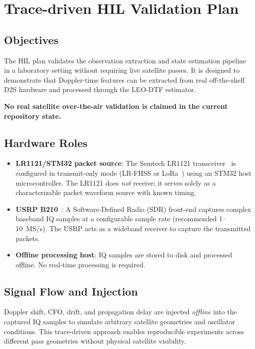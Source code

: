 \section{Trace-driven HIL Validation Plan}\label{sec:hil}

\subsection{Objectives}
The HIL plan validates the observation extraction and state estimation pipeline
in a laboratory setting without requiring live satellite passes.  It is designed
to demonstrate that Doppler-time features can be extracted from real
off-the-shelf D2S hardware and processed through the LEO-DTF estimator.

\textbf{No real satellite over-the-air validation is claimed in the current
repository state.}

\subsection{Hardware Roles}

\begin{itemize}
\item \textbf{LR1121/STM32 packet source}: The Semtech LR1121 transceiver~\cite{semtech_lr1121_datasheet}
        is configured in transmit-only mode (LR-FHSS or LoRa~\cite{semtech_lr_fhss_phy})
        using an STM32 host microcontroller.  The LR1121 does \emph{not} receive; it serves
        solely as a characterizable packet waveform source with known timing.
  \item \textbf{USRP B210}~\cite{ettus_usrp_b210}: A Software-Defined Radio (SDR) front-end captures
        complex baseband IQ samples at a configurable sample rate
        (recommended 1--10~MS/s).  The USRP acts as a wideband receiver to
        capture the transmitted packets.
  \item \textbf{Offline processing host}: IQ samples are stored to disk and
        processed offline.  No real-time processing is required.
\end{itemize}

\subsection{Signal Flow and Injection}
Doppler shift, CFO, drift, and propagation delay are injected \emph{offline}
into the captured IQ samples to simulate arbitrary satellite geometries and
oscillator conditions.  This trace-driven approach enables reproducible
experiments across different pass geometries without physical satellite
visibility.

